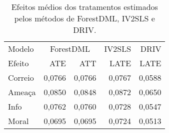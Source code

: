 \begin{table}
\centering
\caption{Efeitos médios dos tratamentos estimados pelos métodos de ForestDML, IV2SLS e DRIV.}
\label{tab:all-effects}
\begin{tabular}{lrrrr}
\toprule
Modelo & \multicolumn{2}{c}{ForestDML} & IV2SLS &   DRIV \\
Efeito &       ATE &    ATT &   LATE &   LATE \\
\midrule
Correio &    0,0766 & 0,0766 & 0,0767 & 0,0588 \\
Ameaça  &    0,0850 & 0,0848 & 0,0872 & 0,0650 \\
Info    &    0,0762 & 0,0760 & 0,0728 & 0,0547 \\
Moral   &    0,0695 & 0,0695 & 0,0724 & 0,0513 \\
\bottomrule
\end{tabular}
\end{table}
